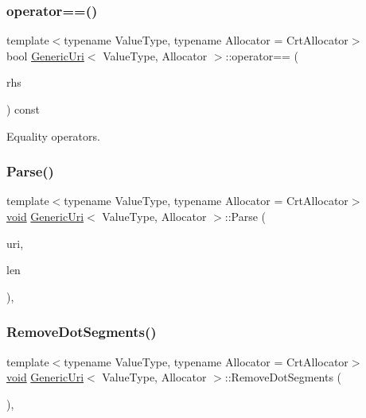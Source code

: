 \subsubsection{\texorpdfstring{operator==()}{operator==()}}
{\footnotesize\ttfamily template$<$typename Value\+Type, typename Allocator = Crt\+Allocator$>$ \\
bool \hyperlink{classGenericUri}{Generic\+Uri}$<$ Value\+Type, Allocator $>$\+::operator== (\begin{DoxyParamCaption}\item[{const \hyperlink{classGenericUri}{Generic\+Uri}$<$ Value\+Type, Allocator $>$ \&}]{rhs }\end{DoxyParamCaption}) const\hspace{0.3cm}{\ttfamily [inline]}}



Equality operators. 

\mbox{\label{classGenericUri_a8e1b49e53460e21b8aebfdf203d985d6}} 
\subsubsection{\texorpdfstring{Parse()}{Parse()}}
{\footnotesize\ttfamily template$<$typename Value\+Type, typename Allocator = Crt\+Allocator$>$ \\
\hyperlink{imgui__impl__opengl3__loader_8h_ac668e7cffd9e2e9cfee428b9b2f34fa7}{void} \hyperlink{classGenericUri}{Generic\+Uri}$<$ Value\+Type, Allocator $>$\+::Parse (\begin{DoxyParamCaption}\item[{const \hyperlink{classGenericUri_a20d0602cff62211d89bc4b25963beeee}{Ch} $\ast$}]{uri,  }\item[{std\+::size\+\_\+t}]{len }\end{DoxyParamCaption})\hspace{0.3cm}{\ttfamily [inline]}, {\ttfamily [private]}}

\mbox{\label{classGenericUri_ab3eb283c9e6e004451430bd9c7580ec8}} 
\subsubsection{\texorpdfstring{Remove\+Dot\+Segments()}{RemoveDotSegments()}}
{\footnotesize\ttfamily template$<$typename Value\+Type, typename Allocator = Crt\+Allocator$>$ \\
\hyperlink{imgui__impl__opengl3__loader_8h_ac668e7cffd9e2e9cfee428b9b2f34fa7}{void} \hyperlink{classGenericUri}{Generic\+Uri}$<$ Value\+Type, Allocator $>$\+::Remove\+Dot\+Segments (\begin{DoxyParamCaption}{ }\end{DoxyParamCaption})\hspace{0.3cm}{\ttfamily [inline]}, {\ttfamily [private]}}

